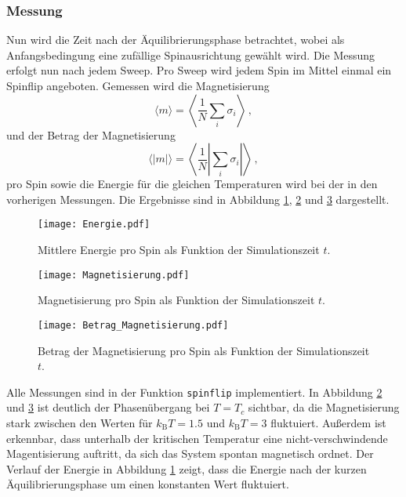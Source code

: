 \subsubsection*{Messung}
Nun wird die Zeit nach der Äquilibrierungsphase betrachtet, wobei als Anfangsbedingung eine zufällige Spinausrichtung
gewählt wird. Die Messung erfolgt nun nach jedem Sweep. 
Pro Sweep wird jedem Spin im Mittel einmal ein Spinflip angeboten. Gemessen wird die Magnetisierung
\begin{equation*}
    \langle m \rangle = \left\langle \frac{1}{N} \sum_i \sigma_i\right\rangle \, ,
\end{equation*}
und der Betrag der Magnetisierung
\begin{equation*}
    \langle | m | \rangle = \left\langle \frac{1}{N} \left| \sum_i \sigma_i \right| \right\rangle \, ,
\end{equation*}
pro Spin sowie die Energie für die gleichen Temperaturen wird bei der in den vorherigen Messungen. Die Ergebnisse sind in Abbildung 
\ref{fig:energie}, \ref{fig:magnetisierung} und \ref{fig:betrag_magnetisierung} dargestellt.
\FloatBarrier
\begin{figure}[H]
    \centering
    \texttt{[image: Energie.pdf]}
    \caption{Mittlere Energie pro Spin als Funktion der Simulationszeit $t$.}
    \label{fig:energie}
\end{figure}
\FloatBarrier
\noindent
\FloatBarrier
\begin{figure}[H]
    \centering
    \texttt{[image: Magnetisierung.pdf]}
    \caption{Magnetisierung pro Spin als Funktion der Simulationszeit $t$.}
    \label{fig:magnetisierung}
\end{figure}
\FloatBarrier
\noindent
\FloatBarrier
\begin{figure}[H]
    \centering
    \texttt{[image: Betrag\_Magnetisierung.pdf]}
    \caption{Betrag der Magnetisierung pro Spin als Funktion der Simulationszeit $t$.}
    \label{fig:betrag_magnetisierung}
\end{figure}
\FloatBarrier
\noindent
Alle Messungen sind in der Funktion \texttt{spinflip} implementiert.
In Abbildung \ref{fig:magnetisierung} und \ref{fig:betrag_magnetisierung} ist deutlich der Phasenübergang bei $T = T_c$ sichtbar, 
da die Magnetisierung stark zwischen den Werten für $k_\text{B}T = 1.5$ und $k_\text{B}T = 3$ fluktuiert. 
Außerdem ist erkennbar, dass unterhalb der kritischen Temperatur eine nicht-verschwindende Magentisierung auftritt, 
da sich das System spontan magnetisch ordnet.
Der Verlauf der Energie in Abbildung \ref{fig:energie} zeigt, dass die Energie nach der kurzen Äquilibrierungsphase 
um einen konstanten Wert fluktuiert. 


